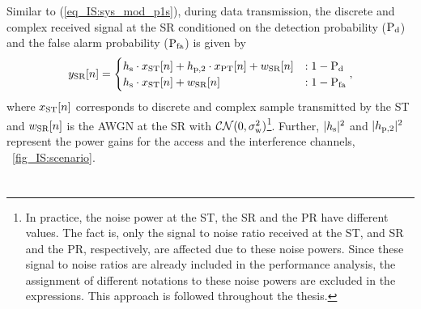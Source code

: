 Similar to (\ref{eq_IS:sys_mod_p1s}), during data transmission, the discrete and complex received signal at the SR conditioned on the detection probability ($\text{P}_{\text{d}}$) and the false alarm probability ($\text{P}_{\text{fa}}$) is given by
\begin{equation}
y_{\text{SR}}[n] = 
\begin{cases}
h_{\text{s}} \cdot x_{\text{ST}}[n] + h_{\text{p,2}} \cdot x_{\text{PT}}[n] +  w_{\text{SR}}[n] & : 1 - \text{P}_{\text{d}} \\
h_{\text{s}} \cdot x_{\text{ST}}[n] + w_{\text{SR}}[n] & : 1 - \text{P}_{\text{fa}}
\end{cases},
\label{eq_IS:sys_mod_ss}
\end{equation}
where $x_{\text{ST}}[n]$ corresponds to discrete and complex sample transmitted by the ST and $w_{\text{SR}}[n]$ is the AWGN at the SR with $\mathcal{CN}(0, \sigma^2_{\text{w}})$\footnote{In practice, the noise power at the ST, the SR and the PR have different values. The fact is, only the signal to noise ratio received at the ST, and SR and the PR, respectively, are affected due to these noise powers. Since these signal to noise ratios are already included in the performance analysis, the assignment of different notations to these noise powers are excluded in the expressions. This approach is followed throughout the thesis.}. Further, $|h_{\text{s}}|^2$ and $|h_{\text{p,2}}|^2$ represent the power gains for the access and the interference channels,  \figurename~\ref{fig_IS:scenario}. 


\section{} \label{sec:pr_mod}

